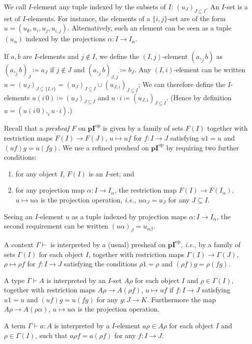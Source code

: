 \documentclass[english]{PaperTools/latex/lipics}
\def\pI{\ensuremath{\mathbf{pI}}}
\def\ie{\textit{i.e.}}
\def\opp{\mathrm{op}}
\begin{document}
\begin{definition}[$I$-set]
  We call $I$-element any tuple indexed by the subsets of $I$: $(u_J)_{J ⊆ I}$.
  An $I$-set is a set of $I$-elements.  For instance, the elements of a
  $\{i,j\}$-set are of the form $u = (u_∅,u_i,u_j,u_{i,j})$.
  Alternatively, such an element can be seen as a tuple $(u_α)$ indexed
  by the projections $α : I → I_α$.
\end{definition}
  If $a,b$ are $I$-elements and $j ∉ I$, we define the $(I,j)$-element
  $(a ,_j b)$ as $(a ,_j b)_J ≔ a_J$ if $j ∉ J$ and $(a ,_j b)_{J,j} ≔ b_J$.
  Any $(I,i)$-element can be written $u = (u_J)_{J ⊆ \{I,i\}} = (u_J)_{J ⊆ I} ∪ (u_{J,i})_{J ⊆ I}$;
  We can therefore define the $I$-elements $u (i\,0) ≔ (u_J)_{J ⊆ I}$ and $u · i ≔ (u_{J,i})_{J ⊆ I}$.
  (Hence by definition $u = (u (i\,0) ,_i u · i)$.)

\bigskip
Recall that a \emph{presheaf} $F$ on $\pI^\opp$ is given by a family of
sets $F(I)$ together with restriction maps $F(I) → F(J)$, $u ↦ uf$ for
$f : I → J$ satisfying $u1 = u$ and $(uf)g = u(fg)$. We use a refined
presheaf on $\pI^\opp$ by requiring two further conditions:
%
\begin{enumerate}
  \item for any object $I$, $F(I)$ is an $I$-set; and
  \item for any projection map $α : I → I_α$, the restriction
    map $F(I) → F(I_α)$, $u ↦ uα$ is the projection operation, \ie,
    $uα_J = u_J$ for any $J ⊆ I$.
\end{enumerate}
%
Seeing an $I$-element $u$ as a tuple indexed by projection maps
$α : I → I_α$, the second requirement can be written $(uα)_β = u_{αβ}$.

\bigskip
A context $Γ ⊢$ is interpreted by a (usual) presheaf on $\pI^\opp$, \ie,
by a family of sets $Γ(I)$ for each object $I$, together with
restriction maps $Γ(I) → Γ(J)$, $ρ ↦ ρf$ for $f : I → J$ satisfying the
conditions $ρ1 = ρ$ and $(ρf)g = ρ(fg)$.

\medskip
A type $Γ ⊢ A$ is interpreted by an $I$-set $Aρ$ for each object $I$ and
$ρ ∈ Γ(I)$,
together with restriction maps $Aρ → A(ρf)$, $u ↦ uf$ if $f : I → J$
satisfying $u1 = u$ and $(uf)g = u(fg)$ for any $g : J → K$.
Furthermore the map $Aρ → A(ρα)$, $u ↦ uα$ is the projection operation.

\medskip
A term $Γ ⊢ a : A$ is interpreted by a $I$-element $aρ ∈ Aρ$ for each
object $I$ and $ρ ∈ Γ(I)$, such that $aρf = a(ρf)$ for any $f : I → J$.
\end{document}
